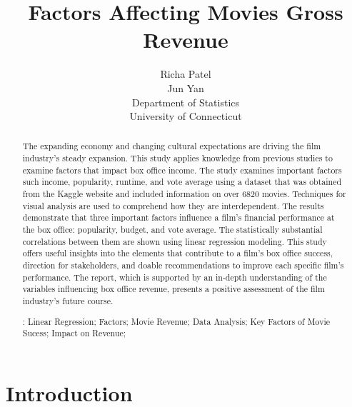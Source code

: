 \documentclass[12pt]{article}
\title{Factors Affecting Movies Gross Revenue}
\author{Richa Patel\\
  Jun Yan\\[2ex]
  Department of Statistics\\
  University of Connecticut\\
}
\begin{document}
\maketitle
\doublespace

\begin{abstract}

The expanding economy and changing cultural expectations are driving the film industry's 
steady expansion. This study applies knowledge from previous studies to examine factors 
that impact box office income. The study examines important factors such income, popularity,
runtime, and vote average using a dataset that was obtained from the Kaggle website and 
included information on over 6820 movies. Techniques for visual analysis are used to 
comprehend how they are interdependent. The results demonstrate that three important 
factors influence a film's financial performance at the box office: popularity, budget,
and vote average. The statistically substantial correlations between them are shown using 
linear regression modeling. This study offers useful insights into the elements that 
contribute to a film's box office success, direction for stakeholders, and doable
recommendations to improve each specific film's performance. The report, which is supported 
by an in-depth understanding of the variables influencing box office revenue, presents
a positive assessment of the film industry's future course.


\bigskip
{}:
Linear Regression; 
Factors;
Movie Revenue;
Data Analysis;
Key Factors of Movie Sucess;
Impact on Revenue;

\end{abstract}


\section{Introduction}
\label{sec:intro}
\end{document}
